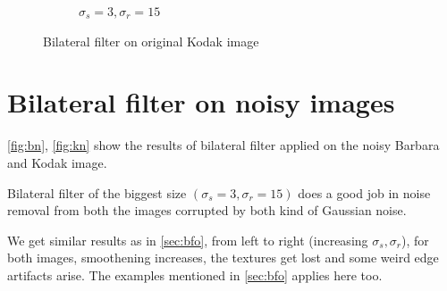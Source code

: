 \documentclass[a4paper, landscape]{article}
\begin{document}
\begin{figure}
\begin{subfigure}{0.33\linewidth}
        \caption{$\sigma_s=3, \sigma_r=15$}
    \end{subfigure}
    \caption{Bilateral filter on original Kodak image}
    \label{fig:ks}
\end{figure}
\section{Bilateral filter on noisy images}
\ref{fig:bn}, \ref{fig:kn} show the results of bilateral filter applied on the noisy Barbara and Kodak image.

Bilateral filter of the biggest size $(\sigma_s=3, \sigma_r=15)$ does a good job in noise removal from both the images corrupted by both kind of Gaussian noise. 

We get similar results as in \ref{sec:bfo}, from left to right (increasing $\sigma_s, \sigma_r$), for both images, smoothening increases, the textures get lost and some weird edge artifacts arise. The examples mentioned in \ref{sec:bfo} applies here too.
\end{document}

